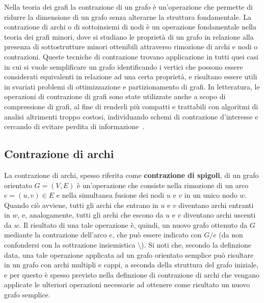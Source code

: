 Nella teoria dei grafi la contrazione di un grafo \`e un'operazione che permette di ridurre la dimensione di un grafo
senza alterarne la struttura fondamentale. \newline
La contrazione di archi o di sottoinsiemi di nodi \`e un operazione fondamentale nella teoria dei grafi minori, dove
si studiano le propriet\`a di un grafo in relazione alla presenza di sottostrutture minori ottenibili attraverso
rimozione di archi e nodi o contrazioni. \newline
Queste tecniche di contrazione trovano applicazione in tutti quei casi in cui si vuole semplificare un grafo
identificando i vertici che possono essere considerati equivalenti in relazione ad una certa propriet\`a,
e risultano essere utili in svariati problemi di ottimizzazione e partizionamento di grafi.
In letteratura, le operazioni di contrazione di grafi sono state utilizzate anche a scopo di compressione di grafi,
al fine di renderli pi\`u compatti e trattabili con algoritmi di analisi altrimenti troppo costosi,
individuando schemi di contrazione d'interesse e cercando di evitare perdita di
informazione~\cite{10.1145/3448016.3452797}. \newline


\subsection{Contrazione di archi}\label{subsec:contrazione-di-archi}

La contrazione di archi, spesso riferita come \textbf{contrazione di spigoli}, di un grafo orientato $G = (V, E)$ \`e
un'operazione che consiste nella rimozione di un  arco $e = (u, v) \in E$ e nella simultanea fusione dei nodi $u$ e
$v$ in un unico nodo $w$.
Quando ci\`o avviene, tutti gli archi che entrano in $u$ e $v$ diventano archi entranti in $w$, e, analogamente,
tutti gli archi che escono da $u$ e $v$ diventano archi uscenti da $w$.
Il risultato di una tale operazione \`e, quindi, un nuovo grafo ottenuto da $G$ mediante la contrazione
dell'arco $e$, che pu\`o essere indicato con $G/e$ (da non confondersi con la sottrazione insiemistica $\setminus$).
Si noti che, secondo la definzione data, una tale operazione applicata ad un grafo orientato semplice pu\`o risultare
in un grafo con archi multipli e cappi, a seconda della struttura del grafo iniziale, e per questo \`e
spesso previsto nella definzione di contrazione di archi che vengano applicate le ulteriori operazioni necessarie ad
ottenere come risultato un nuovo grafo semplice. \newline

